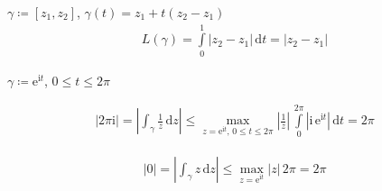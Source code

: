 \begin{example}
  \begin{enum-arab}
    \item $\gamma \coloneq [z_1,z_2]$, $\gamma(t) = z_1 + t(z_2 - z_1)$
    \begin{align*}
      L(\gamma) = \int\limits_{0}^{1} |z_2 - z_1| \, \mathrm{d}t = |z_2 - z_1|
    \end{align*}
    
    \item $\gamma \coloneq \mathrm{e}^{\mathrm{i} t}$, $0 \leq t \leq 2 \pi$
    \begin{enum-alph}
      \item
      \begin{align*}
        |2 \pi \mathrm{i}| = \left| \int_\gamma \frac{1}{z} \, \mathrm{d}z \right| \leq \max\limits_{z = \mathrm{e}^{\mathrm{i} t},\, 0 \leq t \leq 2 \pi} \left| \frac{1}{z} \right| \, \int\limits_{0}^{2 \pi} \left| \mathrm{i} \,  \mathrm{e}^{\mathrm{i} t} \right| \, \mathrm{d}t = 2 \pi
      \end{align*}
      
      \item
      \begin{align*}
        |0| = \left| \int_\gamma z \, \mathrm{d}z \right| \leq \max\limits_{z = \mathrm{e}^{\mathrm{i} t}} |z| \, 2 \pi = 2 \pi
      \end{align*}
    \end{enum-alph}
  \end{enum-arab}
\end{example}

